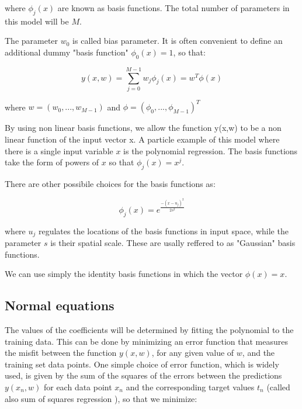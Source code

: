 \noindent where $\phi_j(x)$ are known as basis functions. The total number of parameters in this model will be $M$.

\noindent The parameter $w_0$ is called bias parameter. It is often convenient to define an additional dummy "basis function" $\phi_0(x)=1$, so that:

\begin{Equation}[H]
	\centering
	\begin{equation}
	y(x,w)=\sum_{j=0}^{M-1}w_j \phi_j(x) = w^T\phi(x)
	\end{equation}
	\label{eq:mathmodela}
\end{Equation}

\noindent where $w=(w_0,...,w_{M-1})$ and $\phi=(\phi_0,...,\phi_{M-1})^T$

\noindent By using non linear basis functions, we allow the function y(x,w) to be a non linear function of the input vector x.  A particle example of this model where there is a single input variable $x$ is the polynomial regression. The basis functions take the form of powers of $x$ so that $\phi_j(x)=x^j$.

\noindent There are other possibile choices for the basis functions as:

\begin{Equation}[H]
	\centering
	\begin{equation}
		\phi_j(x)=e^{\frac{-(x-u_j)^2}{2s^2}}
	\end{equation}
	\label{eq:mathmodela}
\end{Equation}

\noindent where $u_j$ regulates the locations of the basis functions in input space, while the parameter $s$ is their spatial scale. These are usally reffered to as "Gaussian" basis functions. 

\noindent We can use simply the identity basis functions in which the vector $\phi(x)=x$.

\subsection{Normal equations}
\label{subsec:reglinmulnormeq}
The values of the coefficients will be determined by fitting the polynomial to the training data. This can be done by minimizing an error function that measures the misfit between the function $y(x, w)$, for any given value of $w$, and the training set data points. One simple choice of error function, which is widely used, is given by the sum of the squares of the errors between the predictions $y(x_n, w)$ for each data point $x_n$ and the corresponding target values $t_n$ (called also sum of squares regression \cite[]{sum-squares}), so that we minimize:

